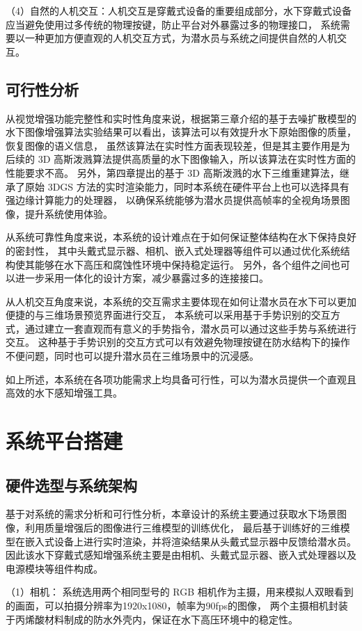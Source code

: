 （4）自然的人机交互：人机交互是穿戴式设备的重要组成部分，水下穿戴式设备应当避免使用过多传统的物理按键，防止平台对外暴露过多的物理接口，
系统需要以一种更加方便直观的人机交互方式，为潜水员与系统之间提供自然的人机交互。

\subsection{可行性分析}
从视觉增强功能完整性和实时性角度来说，根据第三章介绍的基于去噪扩散模型的水下图像增强算法实验结果可以看出，该算法可以有效提升水下原始图像的质量，恢复图像的语义信息，
虽然该算法在实时性方面表现较差，但是其主要作用是为后续的 3D 高斯泼溅算法提供高质量的水下图像输入，所以该算法在实时性方面的性能要求不高。
另外，第四章提出的基于 3D 高斯泼溅的水下三维重建算法，继承了原始 3DGS 方法的实时渲染能力，同时本系统在硬件平台上也可以选择具有强边缘计算能力的处理器，
以确保系统能够为潜水员提供高帧率的全视角场景图像，提升系统使用体验。

从系统可靠性角度来说，本系统的设计难点在于如何保证整体结构在水下保持良好的密封性，
其中头戴式显示器、相机、嵌入式处理器等组件可以通过优化系统结构使其能够在水下高压和腐蚀性环境中保持稳定运行。
另外，各个组件之间也可以进一步采用一体化的设计方案，减少暴露过多的连接接口。

从人机交互角度来说，本系统的交互需求主要体现在如何让潜水员在水下可以更加便捷的与三维场景预览界面进行交互，
本系统可以采用基于手势识别的交互方式，通过建立一套直观而有意义的手势指令，潜水员可以通过这些手势与系统进行交互。
这种基于手势识别的交互方式可以有效避免物理按键在防水结构下的操作不便问题，同时也可以提升潜水员在三维场景中的沉浸感。

如上所述，本系统在各项功能需求上均具备可行性，可以为潜水员提供一个直观且高效的水下感知增强工具。



\section{系统平台搭建} 
\subsection{硬件选型与系统架构}
基于对系统的需求分析和可行性分析，本章设计的系统主要通过获取水下场景图像，利用质量增强后的图像进行三维模型的训练优化，
最后基于训练好的三维模型在嵌入式设备上进行实时渲染，并将渲染结果从头戴式显示器中反馈给潜水员。
因此该水下穿戴式感知增强系统主要是由相机、头戴式显示器、嵌入式处理器以及电源模块等组件构成。

（1）相机：
系统选用两个相同型号的 RGB 相机作为主摄，用来模拟人双眼看到的画面，可以拍摄分辨率为1920x1080，帧率为90fps的图像，
两个主摄相机封装于丙烯酸材料制成的防水外壳内，保证在水下高压环境中的稳定性。


